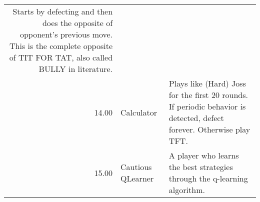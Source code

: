 \begin{tabular}{rll}
	Starts by defecting and then does the opposite of opponent's previous move.
	This is the complete opposite of TIT FOR TAT, also called BULLY in literature.                                                                                                                                                                                                                                                                                                                                                                                                                                                                                                                                                                                                                                                                                                                                                                                 \\
	14.00  & Calculator                  & Plays like (Hard) Joss for the first 20 rounds. If periodic behavior is
	detected, defect forever. Otherwise play TFT.                                                                                                                                                                                                                                                                                                                                                                                                                                                                                                                                                                                                                                                                                                                                                                                                                                                                                                \\
	15.00  & Cautious QLearner           & A player who learns the best strategies through the q-learning algorithm.


\end{tabular}
